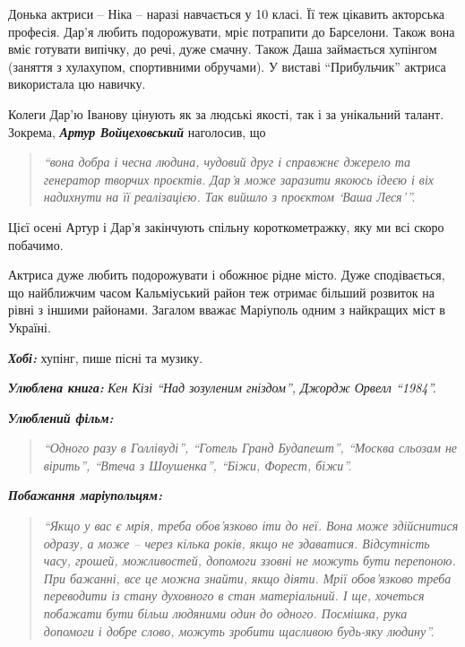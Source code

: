 Донька актриси – Ніка – наразі навчається у 10 класі. Її теж цікавить акторська
професія. Дар'я любить подорожувати, мріє потрапити до Барселони. Також вона
вміє готувати випічку, до речі, дуже смачну. Також Даша займається хупінгом
(заняття з хулахупом, спортивними обручами). У виставі \enquote{Прибульчик} актриса
використала цю навичку.

Колеги Дар'ю Іванову цінують як за людські якості, так і за унікальний талант.
Зокрема, \emph{\textbf{Артур Войцеховський}} наголосив, що 
\begin{quote}
\em\enquote{вона добра і чесна людина, чудовий
друг і справжнє джерело та генератор творчих проєктів. Дар'я може заразити
якоюсь ідеєю і віх надихнути на її реалізацією. Так вийшло з проєктом \enquote{Ваша
Леся}}. 
\end{quote}
Цієї осені Артур і Дар'я закінчують спільну короткометражку, яку ми всі скоро
побачимо.

Актриса дуже любить подорожувати і обожнює рідне місто. Дуже сподівається, що
найближчим часом Кальміуський район теж отримає більший розвиток на рівні з
іншими районами. Загалом вважає Маріуполь одним з найкращих міст в Україні.

\emph{\textbf{Хобі:}} хупінг, пише пісні та музику.

\emph{\textbf{Улюблена книга:}} \emph{Кен Кізі \enquote{Над зозуленим гніздом}, Джордж Орвелл \enquote{1984}.}

\emph{\textbf{Улюблений фільм:}} 

\begin{quote}
\em\enquote{Одного разу в Голлівуді}, \enquote{Готель Гранд Будапешт}, \enquote{Москва
сльозам не вірить}, \enquote{Втеча з Шоушенка}, \enquote{Біжи, Форест, біжи}.
\end{quote}

\emph{\textbf{Побажання маріупольцям:}}

\begin{quote}
\em\enquote{Якщо у вас є мрія, треба обов'язково іти до неї. Вона може здійснитися одразу,
а може – через кілька років, якщо не здаватися.  Відсутність часу, грошей,
можливостей, допомоги ззовні не можуть бути перепоною. При бажанні, все це
можна знайти, якщо діяти. Мрії обов'язково треба переводити із стану духовного
в стан матеріальний. І ще, хочеться побажати бути більш людяними один до
одного. Посмішка, рука допомоги і добре слово, можуть зробити щасливою будь-яку
людину}.
\end{quote}

